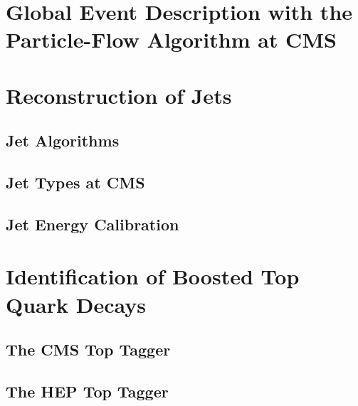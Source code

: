 \section{Global Event Description with the Particle-Flow Algorithm at CMS}
\label{sec:pf_algo}

\section{Reconstruction of Jets}
\label{sec:jets_reco}

\subsection{Jet Algorithms}
\label{subsec:jets_algos}

\subsection{Jet Types at CMS}
\label{subsec:jets_types}

\subsection{Jet Energy Calibration}
\label{subsec:jets_calib}

\section{Identification of Boosted Top Quark Decays}
\label{sec:boosted_tops}

\subsection{The CMS Top Tagger}
\label{sec:boosted_tops_cms_tagger}

\subsection{The HEP Top Tagger}
\label{sec:boosted_tops_hep_top_tagger}
